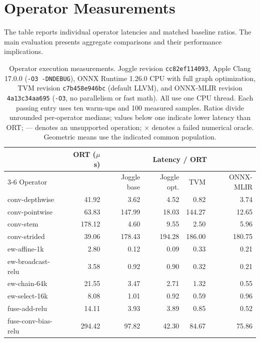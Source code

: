 \section{Operator Measurements}
\label{sec:operator-data}

The table reports individual operator latencies and matched baseline ratios.
The main evaluation presents aggregate comparisons and their performance implications.

\begin{table}[!htbp]
  \caption{Operator execution measurements. Joggle revision
  \texttt{cc82ef114093}, Apple Clang 17.0.0 (\texttt{-O3 -DNDEBUG}),
  ONNX Runtime 1.26.0 CPU with full graph optimization, TVM revision
  \texttt{c7b458e946bc} (default LLVM), and ONNX-MLIR revision
  \texttt{4a13c34aa695} (\texttt{-O3}, no parallelism or fast math).
  All use one CPU thread. Each passing entry uses ten warm-ups and 100
  measured samples. Ratios divide unrounded per-operator medians; values
  below one indicate lower latency than ORT;
  --- denotes an unsupported operation; $\times$ denotes a failed numerical
  oracle. Geometric means use the indicated common population.}
  \label{tab:operator-data}
  \centering
  \footnotesize
  \setlength{\tabcolsep}{5pt}
  \begin{tabular*}{\textwidth}{@{\extracolsep{\fill}}lrrrrr@{}}
    \toprule
    & ORT ($\mu$s) & \multicolumn{4}{c}{Latency / ORT} \\
    \cmidrule(l){3-6}
    Operator & & Joggle base & Joggle opt. & TVM & ONNX-MLIR \\
    \midrule
    conv-depthwise & 41.92 & 3.62 & 4.52 & 0.82 & 3.74 \\
    conv-pointwise & 63.83 & 147.99 & 18.03 & 144.27 & 12.65 \\
    conv-stem & 178.12 & 4.60 & 9.55 & 2.50 & 5.96 \\
    conv-strided & 39.06 & 178.43 & 194.28 & 186.00 & 180.75 \\
    \midrule
    ew-affine-1k & 2.80 & 0.12 & 0.09 & 0.33 & 0.21 \\
    ew-broadcast-relu & 3.58 & 0.92 & 0.90 & 0.32 & 0.21 \\
    ew-chain-64k & 21.55 & 3.47 & 2.71 & 1.32 & 0.55 \\
    ew-select-16k & 8.08 & 1.01 & 0.92 & 0.59 & 0.96 \\
    \midrule
    fuse-add-relu & 14.11 & 3.93 & 3.89 & 0.85 & 0.52 \\
    fuse-conv-bias-relu & 294.42 & 97.82 & 42.30 & 84.67 & 75.86 \\

\end{tabular*}
\end{table}
